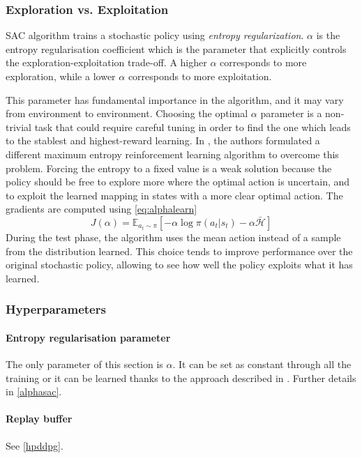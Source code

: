 \subsubsection{Exploration vs. Exploitation} \label{alphasac}
SAC algorithm trains a stochastic policy using \textit{entropy regularization}. $\alpha$ is the entropy regularisation coefficient which is the parameter that explicitly controls the exploration-exploitation trade-off. A higher $\alpha$ corresponds to more exploration, while a lower $\alpha$ corresponds to more exploitation.

This parameter has fundamental importance in the algorithm, and it may vary from environment to environment. Choosing the optimal $\alpha$ parameter is a non-trivial task that could require careful tuning in order to find the one which leads to the stablest and highest-reward learning. In \cite[Section 5]{haarnoja2018alg}, the authors formulated a different maximum entropy reinforcement learning algorithm to overcome this problem.
Forcing the entropy to a fixed value is a weak solution because the policy should be free to explore more where the optimal action is uncertain, and to exploit the learned mapping in states with a more clear optimal action.
The gradients are computed using \vref{eq:alphalearn}
\begin{equation} \label{eq:alphalearn}
	J(\alpha) = \mathbb{E}_{a_t \sim \pi}[-\alpha \log\pi(a_t|s_t) - \alpha \bar{\mathcal{H}}]
\end{equation}
During the test phase, the algorithm uses the mean action instead of a  sample from the distribution learned. This choice tends to improve performance over the original stochastic policy, allowing to see how well the policy exploits what it has learned.

\subsubsection{Hyperparameters}

\paragraph{Entropy regularisation parameter} The only parameter of this section is $\alpha$. It can be set as constant through all the training or it can be learned thanks to the approach described in \cite{haarnoja2018alg}. Further details in \vref{alphasac}.
\paragraph{Replay buffer} See \vref{hpddpg}.
